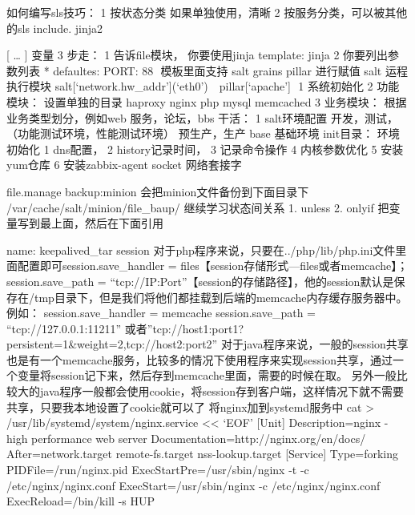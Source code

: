 {{{{{{{{如何编写sls技巧：
1 按状态分类 如果单独使用，清晰
2 按服务分类，可以被其他的sls include.
jinja2
{{%
{{[ … ]}} 变量
3 步走：
1 告诉file模块， 你要使用jinja
template: jinja
2 你要列出参数列表
* defaultes: PORT: 88  模板里面支持 salt grains pillar 进行赋值 salt 运程执行模块 {{ salt[‘network.hw_addr’](‘eth0’) }} {{ pillar[‘apache’]}} 
1 系统初始化
2 功能模块： 设置单独的目录 haproxy nginx php mysql memcached
3 业务模块： 根据业务类型划分，例如web 服务，论坛，bbs
干活： 1 salt环境配置
开发，测试，（功能测试环境，性能测试环境） 预生产，生产
base 基础环境
init目录： 环境初始化 1 dns配置， 2 history记录时间， 3 记录命令操作 4 内核参数优化 5 安装yum仓库 6 安装zabbix-agent
socket 网络套接字

file.manage
backup:minion
会把minion文件备份到下面目录下
/var/cache/salt/minion/file_baup/
继续学习状态间关系
1. unless
2. onlyif
把变量写到最上面，然后在下面引用
{%
name: {{ keepalived_tar }}
session
对于php程序来说，只要在../php/lib/php.ini文件里面配置即可session.save_handler = files【session存储形式—files或者memcache】；session.save_path = “tcp://IP:Port”【session的存储路径】，他的session默认是保存在/tmp目录下，但是我们将他们都挂载到后端的memcache内存缓存服务器中。
例如：
session.save_handler = memcache
session.save_path = “tcp://127.0.0.1:11211” 或者”tcp://host1:port1?persistent=1&weight=2,tcp://host2:port2”
对于java程序来说，一般的session共享也是有一个memcache服务，比较多的情况下使用程序来实现session共享，通过一个变量将session记下来，然后存到memcache里面，需要的时候在取。
另外一般比较大的java程序一般都会使用cookie，将session存到客户端，这样情况下就不需要共享，只要我本地设置了cookie就可以了
将nginx加到systemd服务中
cat > /usr/lib/systemd/system/nginx.service << ‘EOF’
[Unit]
Description=nginx - high performance web server
Documentation=http://nginx.org/en/docs/
After=network.target remote-fs.target nss-lookup.target
[Service]
Type=forking
PIDFile=/run/nginx.pid
ExecStartPre=/usr/sbin/nginx -t -c /etc/nginx/nginx.conf
ExecStart=/usr/sbin/nginx -c /etc/nginx/nginx.conf
ExecReload=/bin/kill -s HUP 

}}}}}}}}}}}

